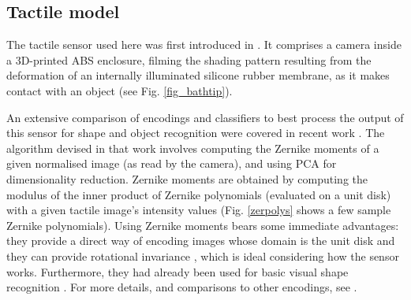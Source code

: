 \documentclass[9pt,technote]{IEEEtran}  %
\begin{document}
\subsection{Tactile model}
The tactile sensor used here was first introduced in \cite{Corradi2014}. It comprises a camera inside a 3D-printed ABS enclosure, filming the shading pattern resulting from the deformation of an internally illuminated silicone rubber membrane, as it makes contact with an object (see Fig. \ref{fig_bathtip}). 
\begin{figure}
\centering
{}
\end{figure}
An extensive comparison of encodings and classifiers to best process the output of this sensor for shape and object recognition were covered in recent work \cite{Corradi2014,Corradi2015}. The algorithm devised in that work involves computing the Zernike moments \cite{Zernike1934} of a given normalised image (as read by the camera), and using PCA for dimensionality reduction. Zernike moments are obtained by computing the modulus of the inner product of Zernike polynomials (evaluated on a unit disk) with a given tactile image's intensity values (Fig. \ref{zerpolys} shows a few sample Zernike polynomials). Using Zernike moments bears some immediate advantages: they provide a direct way of encoding images whose domain is the unit disk and they can provide rotational invariance \cite{Khotanzad1990a} , which is ideal considering how the sensor works. Furthermore, they had already been used for basic visual shape recognition \cite{Wu2012}. For more details, and comparisons to other encodings, see \cite{Corradi2015}.
\begin{figure}
	\centering
	\end{figure}
	
\end{document}
